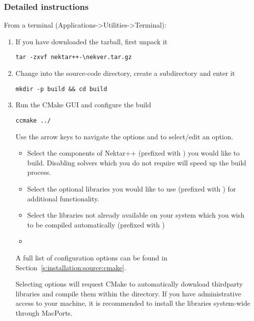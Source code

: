 \subsubsection{Detailed instructions}
From a terminal (Applications->Utilities->Terminal):
\begin{enumerate}
    \item If you have downloaded the tarball, first unpack it
    \begin{lstlisting}[style=BashInputStyle]
    tar -zxvf nektar++-\nekver.tar.gz
    \end{lstlisting}

    \item Change into the source-code directory, create a 
    subdirectory and enter it 
    \begin{lstlisting}[style=BashInputStyle]
    mkdir -p build && cd build
    \end{lstlisting}
    
    \item Run the CMake GUI and configure the build
    \begin{lstlisting}[style=BashInputStyle]
    ccmake ../
    \end{lstlisting}
    Use the arrow keys to navigate the options and  to select/edit
    an option.
    \begin{itemize}
        \item Select the components of Nektar++ (prefixed with
        ) you would like to build. Disabling solvers
        which you do not require will speed up the build process.
        \item Select the optional libraries you would like to use (prefixed with
        ) for additional functionality.
        \item Select the libraries not already available on your system which
        you wish to be compiled automatically (prefixed with 
        )
        \item 
    \end{itemize}
    A full list of configuration options can be found in
    Section~\ref{s:installation:source:cmake}.

    \begin{notebox}
    Selecting  options will request CMake to
    automatically download thirdparty libraries and compile them within the
    \nekpp directory. If you have administrative access to your machine, it is
    recommended to install the libraries system-wide through MacPorts.
    \end{notebox}
    

\end{enumerate}
